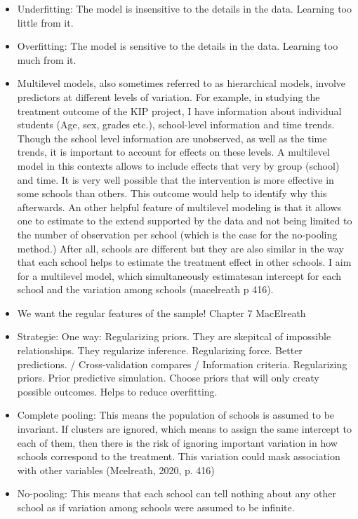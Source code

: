 \documentclass[a4, 12pt]{article}
\begin{document}
\begin{itemize}
\item
  Underfitting: The model is insensitive to the details in the data. Learning too little from it.
\item
  Overfitting: The model is sensitive to the details in the data. Learning too much from it.
\item
  Multilevel models, also sometimes referred to as hierarchical models, involve predictors at different levels of variation. For example, in studying the treatment outcome of the KIP project, I have information about individual students (Age, sex, grades etc.), school-level information and time trends. Though the school level information are unobserved, as well as the time trends, it is important to account for effects on these levels. A multilevel model in this contexts allows to include effects that very by group (school) and time. It is very well possible that the intervention is more effective in some schools than others. This outcome would help to identify why this afterwards. An other helpful feature of multilevel modeling is that it allows one to estimate to the extend supported by the data and not being limited to the number of observation per school (which is the case for the no-pooling method.)
  After all, schools are different but they are also similar in the way that each school helps to estimate the treatment effect in other schools. I aim for a multilevel model, which simultaneously estimatesan intercept for each school and the variation among schools (macelreath p 416).
\item
  We want the regular features of the sample! Chapter 7 MacElreath
\item
  Strategie: One way: Regularizing priors. They are skepitcal of impossible relationships. They regularize inference. Regularizing force. Better predictions. / Cross-validation compares / Information criteria. Regularizing priors. Prior predictive simulation. Choose priors that will only creaty possible outcomes. Helps to reduce overfitting.
\item
  Complete pooling: This means the population of schools is assumed to be invariant. If clusters are ignored, which means to assign the same intercept to each of them, then there is the risk of ignoring important variation in how schools correspond to the treatment. This variation could mask association with other variables (Mcelreath, 2020, p. 416)
\item
  No-pooling: This means that each school can tell nothing about any other school as if variation among schools were assumed to be infinite.

\end{itemize}
\end{document}
